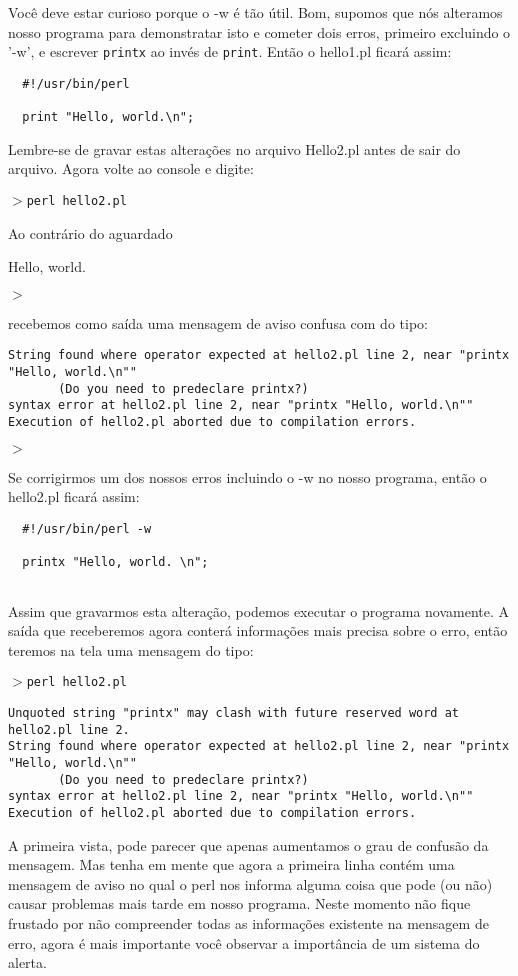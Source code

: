 \documentclass[a4paper,12pt,twoside]{book}
\begin{document}
\noindent Você deve estar curioso porque o -w é tão útil. Bom, supomos que nós 
alteramos nosso programa para demonstratar isto e cometer dois erros,
primeiro excluindo o '-w', e escrever \texttt{printx} ao invés de \texttt{print}. 
Então o hello1.pl ficará assim: 

\begin{lstlisting}
  #!/usr/bin/perl

  print "Hello, world.\n";
\end{lstlisting}


\noindent Lembre-se de gravar estas alterações no arquivo Hello2.pl antes
de sair do arquivo. Agora volte ao console e digite:\medskip

\noindent $>$\texttt{perl hello2.pl}\medskip

\noindent Ao contrário do aguardado\medskip

\noindent Hello, world.

\noindent $>$\medskip

\noindent recebemos como saída uma mensagem de aviso confusa com do tipo:
{\scriptsize
\begin{verbatim}
String found where operator expected at hello2.pl line 2, near "printx "Hello, world.\n""                                                                                                              
       (Do you need to predeclare printx?)
syntax error at hello2.pl line 2, near "printx "Hello, world.\n""
Execution of hello2.pl aborted due to compilation errors.
\end{verbatim}
}\noindent $>$\medskip

\noindent Se corrigirmos um dos nossos erros incluindo o -w no nosso programa, então o hello2.pl ficará assim:\medskip
\begin{lstlisting}
  #!/usr/bin/perl -w

  printx "Hello, world. \n";
 
\end{lstlisting}
\noindent Assim que gravarmos esta alteração, podemos executar o programa novamente. 
A saída que receberemos agora conterá informações mais precisa sobre o erro, 
então teremos na tela uma mensagem do tipo:\medskip

\noindent $>$\texttt{perl hello2.pl}\medskip
{\scriptsize
\begin{verbatim}
Unquoted string "printx" may clash with future reserved word at hello2.pl line 2.
String found where operator expected at hello2.pl line 2, near "printx "Hello, world.\n""
       (Do you need to predeclare printx?)
syntax error at hello2.pl line 2, near "printx "Hello, world.\n""
Execution of hello2.pl aborted due to compilation errors.
\end{verbatim}
}
\noindent A primeira vista, pode parecer que apenas aumentamos o grau de confusão 
da mensagem. Mas tenha em mente que agora a primeira linha contém uma mensagem de
aviso no qual o perl nos informa alguma coisa que pode (ou não) causar problemas 
mais tarde em nosso programa. Neste momento não fique frustado por não compreender 
todas as informações existente na mensagem de erro, agora é mais importante você 
observar a importância de um sistema do alerta.\medskip
\end{document}

